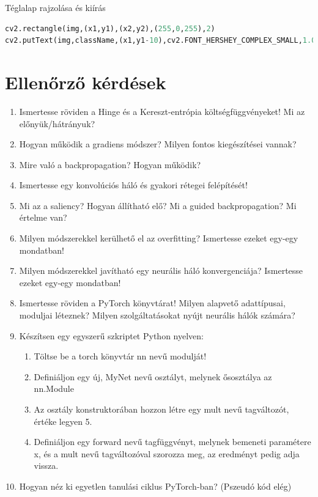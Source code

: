 \documentclass[12pt,a4paper,oneside]{report}             %
\begin{document}
Téglalap rajzolása és kiírás

\begin{lstlisting}[language=Python]
cv2.rectangle(img,(x1,y1),(x2,y2),(255,0,255),2)
cv2.putText(img,className,(x1,y1-10),cv2.FONT_HERSHEY_COMPLEX_SMALL,1.0,(0,255,0))
\end{lstlisting}



\chapter{Ellenőrző kérdések}

\begin{enumerate}
\item Ismertesse röviden a Hinge és a Kereszt-entrópia költségfüggvényeket! Mi az előnyük/hátrányuk?
\item Hogyan működik a gradiens módszer? Milyen fontos kiegészítései vannak?
\item Mire való a backpropagation? Hogyan működik?
\item Ismertesse egy konvolúciós háló és gyakori rétegei felépítését!
\item Mi az a saliency? Hogyan állítható elő? Mi a guided backpropagation? Mi értelme van?
\item Milyen módszerekkel kerülhető el az overfitting? Ismertesse ezeket egy-egy mondatban!
\item Milyen módszerekkel javítható egy neurális háló konvergenciája? Ismertesse ezeket egy-egy mondatban!
\item Ismertesse röviden a PyTorch könyvtárat! Milyen alapvető adattípusai, moduljai léteznek? Milyen szolgáltatásokat nyújt neurális hálók számára?
\item Készítsen egy egyszerű szkriptet Python nyelven: 
\begin{enumerate}
\item Töltse be a torch könyvtár nn nevű modulját!
\item Definiáljon egy új, MyNet nevű osztályt, melynek ősosztálya az nn.Module
\item Az osztály konstruktorában hozzon létre egy mult nevű tagváltozót, értéke legyen 5.
\item Definiáljon egy forward nevű tagfüggvényt, melynek bemeneti paramétere x, és a mult nevű tagváltozóval szorozza meg, az eredményt pedig adja vissza.
\end{enumerate}
\item Hogyan néz ki egyetlen tanulási ciklus PyTorch-ban? (Pszeudó kód elég)
\end{enumerate}


\printbibliography
\end{document}
